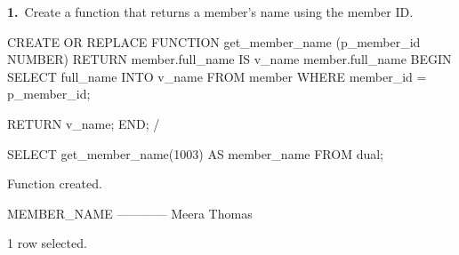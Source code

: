\noindent\begin{minipage}{\linewidth}
\begingroup{}
{\fontsize{14}{17}\selectfont\textbf{1.}}\ Create a function that returns a member's name using the member ID.\par
\endgroup\vspace{12pt}


\begin{sqlcode}
CREATE OR REPLACE FUNCTION get_member_name (p_member_id NUMBER)
RETURN member.full_name%
IS
   v_name member.full_name%
BEGIN
   SELECT full_name INTO v_name
   FROM member
   WHERE member_id = p_member_id;

   RETURN v_name;
END;
/

SELECT get_member_name(1003) AS member_name FROM dual;
\end{sqlcode}

\vspace{18pt}


\begin{sqlout}[fontsize=\small]
Function created.

MEMBER_NAME 
------------
Meera Thomas

1 row selected.
\end{sqlout}
\end{minipage}\par\vspace{24pt}

